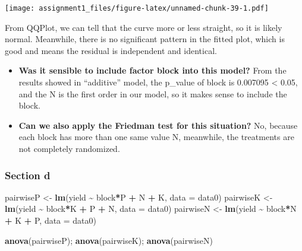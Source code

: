 \documentclass[
]{article}
\newenvironment{Shaded}{\begin{snugshade}}{\end{snugshade}}
\newcommand{\AttributeTok}[1]{\textcolor[rgb]{0.13,0.29,0.53}{#1}}
\newcommand{\FunctionTok}[1]{\textcolor[rgb]{0.13,0.29,0.53}{\textbf{#1}}}
\newcommand{\NormalTok}[1]{#1}
\newcommand{\OtherTok}[1]{\textcolor[rgb]{0.56,0.35,0.01}{#1}}
\newcommand{\SpecialCharTok}[1]{\textcolor[rgb]{0.81,0.36,0.00}{\textbf{#1}}}
\providecommand{\tightlist}{%
  \setlength{\itemsep}{0pt}\setlength{\parskip}{0pt}}
\begin{document}
\texttt{[image: assignment1\_files/figure-latex/unnamed-chunk-39-1.pdf]}

From QQPlot, we can tell that the curve more or less straight, so it is
likely normal. Meanwhile, there is no significant pattern in the fitted
plot, which is good and means the residual is independent and identical.

\begin{itemize}
\tightlist
\item
  \textbf{Was it sensible to include factor block into this model?} From
  the results showed in ``additive'' model, the p\_value of block is
  0.007095 \textless{} 0.05, and the N is the first order in our model,
  so it makes sense to include the block.
\item
  \textbf{Can we also apply the Friedman test for this situation?} No,
  because each block has more than one same value N, meanwhile, the
  treatments are not completely randomized.
\end{itemize}

\subsubsection{Section d}\label{section-d-1}

\begin{Shaded}
\begin{Highlighting}[]
\NormalTok{pairwiseP }\OtherTok{\textless{}{-}} \FunctionTok{lm}\NormalTok{(yield }\SpecialCharTok{\textasciitilde{}}\NormalTok{ block}\SpecialCharTok{*}\NormalTok{P }\SpecialCharTok{+}\NormalTok{ N }\SpecialCharTok{+}\NormalTok{ K, }\AttributeTok{data =}\NormalTok{ data0) }
\NormalTok{pairwiseK }\OtherTok{\textless{}{-}} \FunctionTok{lm}\NormalTok{(yield }\SpecialCharTok{\textasciitilde{}}\NormalTok{ block}\SpecialCharTok{*}\NormalTok{K }\SpecialCharTok{+}\NormalTok{ P }\SpecialCharTok{+}\NormalTok{ N, }\AttributeTok{data =}\NormalTok{ data0) }
\NormalTok{pairwiseN }\OtherTok{\textless{}{-}} \FunctionTok{lm}\NormalTok{(yield }\SpecialCharTok{\textasciitilde{}}\NormalTok{ block}\SpecialCharTok{*}\NormalTok{N }\SpecialCharTok{+}\NormalTok{ K }\SpecialCharTok{+}\NormalTok{ P, }\AttributeTok{data =}\NormalTok{ data0)}
\end{Highlighting}
\end{Shaded}

\begin{Shaded}
\begin{Highlighting}[]
\FunctionTok{anova}\NormalTok{(pairwiseP); }\FunctionTok{anova}\NormalTok{(pairwiseK); }\FunctionTok{anova}\NormalTok{(pairwiseN)}
\end{Highlighting}
\end{Shaded}
\end{document}
